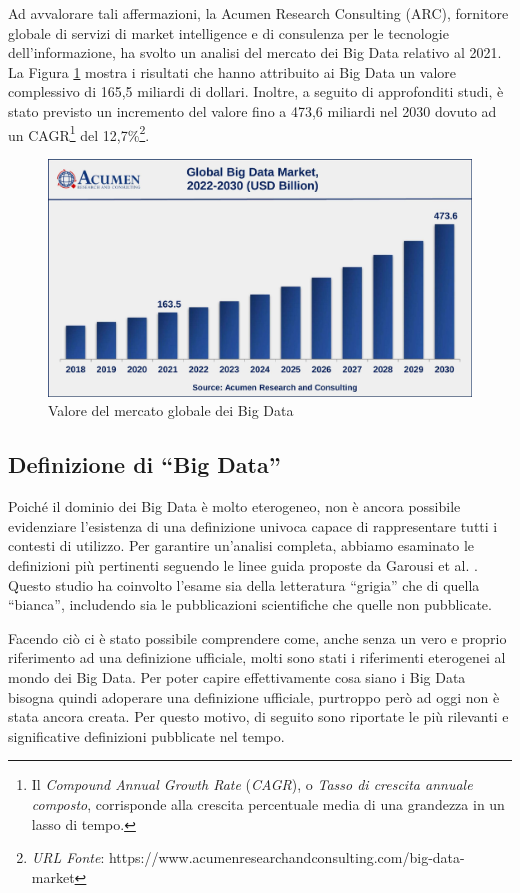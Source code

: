 Ad avvalorare tali affermazioni, la Acumen Research Consulting (ARC), fornitore globale di servizi di market intelligence e di consulenza per le tecnologie dell'informazione, ha svolto un analisi del mercato dei Big Data relativo al 2021. La Figura \ref{fig:Global-Big-Data-Market} mostra i risultati che hanno attribuito ai Big Data un valore complessivo di 165,5 miliardi di dollari. Inoltre, a seguito di approfonditi studi, è stato previsto un incremento del valore fino a 473,6 miliardi nel 2030 dovuto ad un CAGR\footnote{Il \textit{Compound Annual Growth Rate} (\textit{CAGR}), o \textit{Tasso di crescita annuale composto}, corrisponde alla crescita percentuale media di una grandezza in un lasso di tempo.} del 12,7\%\footnote{\textit{URL Fonte}: https://www.acumenresearchandconsulting.com/big-data-market}.

\begin{figure}[H]
    \centering
    \includegraphics[width=0.7\linewidth]{figure/capitolo_2/Global-Big-Data-Market.pdf}
    \caption{Valore del mercato globale dei Big Data}
    \label{fig:Global-Big-Data-Market}
\end{figure}

\subsection{Definizione di ``Big Data''}

Poiché il dominio dei Big Data è molto eterogeneo, non è ancora possibile evidenziare l'esistenza di una definizione univoca capace di rappresentare tutti i contesti di utilizzo. Per garantire un'analisi completa, abbiamo esaminato le definizioni più pertinenti seguendo le linee guida proposte da Garousi et al. \cite{GAROUSI}. Questo studio ha coinvolto l'esame sia della letteratura ``grigia'' che di quella ``bianca'', includendo sia le pubblicazioni scientifiche che quelle non pubblicate.

Facendo ciò ci è stato possibile comprendere come, anche senza un vero e proprio riferimento ad una definizione ufficiale, molti sono stati i riferimenti eterogenei al mondo dei Big Data. Per poter capire effettivamente cosa siano i Big Data bisogna quindi adoperare una definizione ufficiale, purtroppo però ad oggi non è stata ancora creata. Per questo motivo, di seguito sono riportate le più rilevanti e significative definizioni pubblicate nel tempo.

